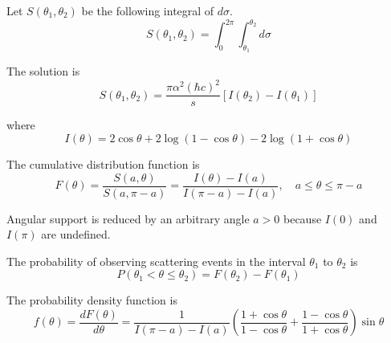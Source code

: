 Let $S(\theta_1,\theta_2)$ be the following integral of $d\sigma$.
\begin{equation*}
S(\theta_1,\theta_2)=\int_0^{2\pi}\int_{\theta_1}^{\theta_2}d\sigma
\end{equation*}

The solution is
\begin{equation*}
S(\theta_1,\theta_2)=\frac{\pi\alpha^2(\hbar c)^2}{s}
[I(\theta_2)-I(\theta_1)]
\end{equation*}

where
\begin{equation*}
I(\theta)=2\cos\theta+2\log(1-\cos\theta)-2\log(1+\cos\theta)
\end{equation*}

The cumulative distribution function is
\begin{equation*}
F(\theta)
=\frac{S(a,\theta)}{S(a,\pi-a)}
=\frac{I(\theta)-I(a)}{I(\pi-a)-I(a)},
\quad
a\le\theta\le\pi-a
\end{equation*}

Angular support is reduced by an arbitrary angle $a>0$ because $I(0)$ and $I(\pi)$ are undefined.

\bigskip
The probability of observing scattering events in the interval $\theta_1$ to $\theta_2$ is
\begin{equation*}
P(\theta_1<\theta\le\theta_2)=F(\theta_2)-F(\theta_1)
\end{equation*}

The probability density function is
\begin{equation*}
f(\theta)=\frac{dF(\theta)}{d\theta}
=\frac{1}{I(\pi-a)-I(a)}
\left(\frac{1+\cos\theta}{1-\cos\theta}+\frac{1-\cos\theta}{1+\cos\theta}\right)
\sin\theta
\end{equation*}


